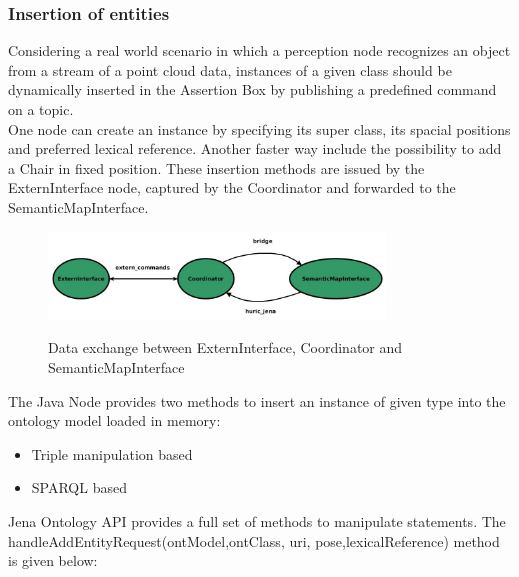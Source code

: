 \subsubsection{Insertion of entities}
\label{subsec: insertion}
Considering a real world scenario in which a perception node recognizes an object from a stream of a point cloud data, instances of a given class should be dynamically inserted in the Assertion Box by publishing a predefined command on a topic.\\
One node can create an instance by specifying its super class, its spacial positions and preferred lexical reference. Another faster way include the possibility to add a Chair in fixed position. These insertion methods are issued by the ExternInterface node, captured by the Coordinator and forwarded to the SemanticMapInterface.


\begin{figure}[H]
\centering
\includegraphics[width=0.8\textwidth]{imgs/topics2.jpg}
\label{fig:actions}
\caption{Data exchange between ExternInterface, Coordinator and SemanticMapInterface}
\end{figure}


The Java Node provides two methods to insert an instance of given type into the ontology model loaded in memory:
\begin{itemize}
\item Triple manipulation based
\item SPARQL based
\end{itemize}
Jena Ontology API provides a full set of methods to manipulate statements. The handleAddEntityRequest(ontModel,ontClass, uri, pose,lexicalReference) method is given below:

